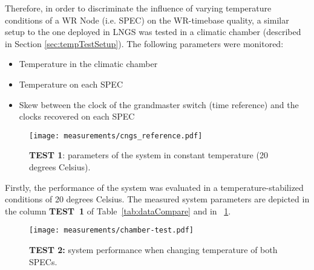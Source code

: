 Therefore, in order to discriminate the influence of varying temperature conditions of a 
WR Node (i.e. SPEC) on the WR-timebase quality, a similar setup to the one 
deployed in LNGS was tested in a climatic chamber (described in Section \ref{sec:tempTestSetup}). 
The following parameters were monitored:
\begin{itemize}
  \item Temperature in the climatic chamber
  \item Temperature on each SPEC
  \item Skew between the clock of the grandmaster switch (time reference) and the clocks recovered 
        on each SPEC
\end{itemize}

\begin{figure}[!t]
\centering
\texttt{[image: measurements/cngs\_reference.pdf]}
\caption{\textbf{TEST 1}: parameters of the system in constant temperature (20 degrees Celsius).}
\label{fig:chamber-ref}
\end{figure}
% 

Firstly, the performance of the system was evaluated in a temperature-stabilized conditions of 
20 degrees Celsius. The measured 
system parameters are depicted in the column \textbf{TEST~1} of Table~\ref{tab:dataCompare} and in 
\figurename~\ref{fig:chamber-ref}.


\begin{figure}[!t]
\centering
\texttt{[image: measurements/chamber-test.pdf]}
\caption{\textbf{TEST 2:} system performance when changing temperature of both SPECs.}
\label{fig:chamber-test}
\end{figure}


